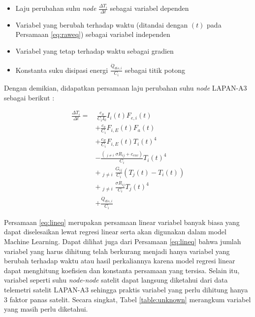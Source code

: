 \begin{itemize}
	\item Laju perubahan suhu \textit{node} $\frac{\Delta T_i}{\Delta t}$ sebagai variabel dependen
	\item Variabel yang berubah terhadap waktu (ditandai dengan $(t)$ pada Persamaan \ref{eq:raweq}) sebagai variabel independen
	\item Variabel yang tetap terhadap waktu sebagai gradien
	\item Konstanta suku disipasi energi $\frac{\dot{Q}_{dis,i}}{C_i}$ sebagai titik potong
\end{itemize}

Dengan demikian, didapatkan persamaan laju perubahan suhu \textit{node} LAPAN-A3 sebagai berikut :

\begin{equation}
\label{eq:lineq}
\begin{split}
	\frac{\Delta T_i}{\Delta t} = &\ \frac{c_S}{C_i I_0} I_{i}(t) F_{e,i}(t) \\
	&+ \frac{c_a}{C_i} F_{i,E}(t) F_a(t) \\
	&+ \frac{c_E}{C_i} F_{i,E}(t) T_{i}(t)^4 \\
	&- \frac{\left( \mathop{\sum_{j=1}^{N}}_{j \neq i} \sigma R_{ij} + c_{env} \right) }{C_i} T_{i}(t)^4 \\
	&+ \mathop{\sum_{j=1}^{N}}_{j \neq i} \frac{G_{ij}}{C_i} \left(T_j(t) - T_i(t)\right) \\
	&+ \mathop{\sum_{j=1}^{N}}_{j \neq i} \frac{\sigma R_{ij}}{C_i}T_{j}(t)^4 \\
	&+ \frac{\dot{Q}_{dis,i}}{C_i}
\end{split}
\end{equation}

Persamaan \ref{eq:lineq} merupakan persamaan linear variabel banyak biasa yang
dapat diselesaikan lewat regresi linear serta akan digunakan dalam model
Machine Learning. Dapat dilihat juga dari Persamaan \ref{eq:lineq} bahwa jumlah
variabel yang harus dihitung telah berkurang menjadi hanya variabel yang
berubah terhadap waktu atau hasil perkaliannya karena model regresi linear
dapat menghitung koefisien dan konstanta persamaan yang tersisa. Selain itu,
variabel seperti suhu \textit{node-node} satelit dapat langsung diketahui dari data
telemetri satelit LAPAN-A3 sehingga praktis variabel yang perlu dihitung hanya
3 faktor panas satelit. Secara singkat, Tabel \ref{table:unknown} merangkum
variabel yang masih perlu diketahui.


